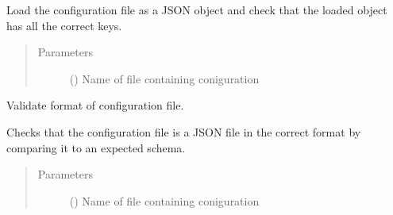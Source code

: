 \documentclass[letterpaper,10pt,english]{sphinxmanual}
\begin{document}
\begin{fulllineitems}
\begin{fulllineitems}
Load the configuration file as a JSON object and check
that the loaded object has all the correct keys.
\begin{quote}\begin{description}
\item[{Parameters}] \leavevmode
{} () \textendash{} Name of file containing coniguration

\end{description}\end{quote}

\end{fulllineitems}


\begin{fulllineitems}
\label{\detokenize{pumha:pumha.pop.Configuration.valid_config}}
Validate format of configuration file.

Checks that the configuration file is a JSON file in
the correct format by comparing it to an expected schema.
\begin{quote}\begin{description}
\item[{Parameters}] \leavevmode
{} () \textendash{} Name of file containing coniguration

\end{description}\end{quote}

\end{fulllineitems}


\end{fulllineitems}

\end{document}
